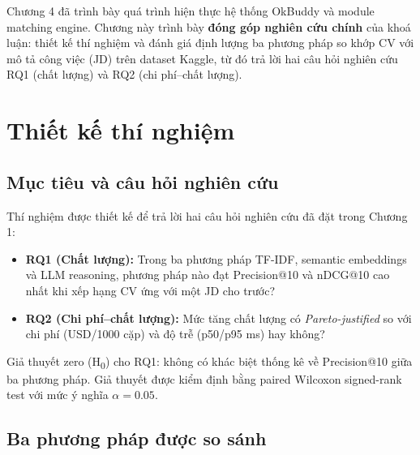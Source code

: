 \documentclass[../DoAn.tex]{subfiles}
\begin{document}

Chương 4 đã trình bày quá trình hiện thực hệ thống OkBuddy và module matching engine. Chương này trình bày \textbf{đóng góp nghiên cứu chính} của khoá luận: thiết kế thí nghiệm và đánh giá định lượng ba phương pháp so khớp CV với mô tả công việc (JD) trên dataset Kaggle, từ đó trả lời hai câu hỏi nghiên cứu RQ1 (chất lượng) và RQ2 (chi phí--chất lượng).

\section{Thiết kế thí nghiệm}
\label{sec:exp_design}

\subsection{Mục tiêu và câu hỏi nghiên cứu}

Thí nghiệm được thiết kế để trả lời hai câu hỏi nghiên cứu đã đặt trong Chương 1:

\begin{itemize}
    \item \textbf{RQ1 (Chất lượng):} Trong ba phương pháp TF-IDF, semantic embeddings và LLM reasoning, phương pháp nào đạt Precision@10 và nDCG@10 cao nhất khi xếp hạng CV ứng với một JD cho trước?
    \item \textbf{RQ2 (Chi phí--chất lượng):} Mức tăng chất lượng có \textit{Pareto-justified} so với chi phí (USD/1000 cặp) và độ trễ (p50/p95 ms) hay không?
\end{itemize}

Giả thuyết zero (H\textsubscript{0}) cho RQ1: không có khác biệt thống kê về Precision@10 giữa ba phương pháp. Giả thuyết được kiểm định bằng paired Wilcoxon signed-rank test với mức ý nghĩa $\alpha = 0.05$.

\subsection{Ba phương pháp được so sánh}
\end{document}
